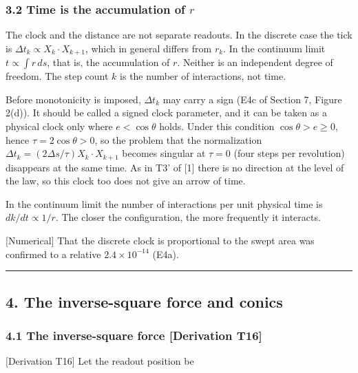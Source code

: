 \documentclass[
  a4paper,
]{article}
\begin{document}
\subsubsection{\texorpdfstring{3.2 Time is the accumulation of
\(r\)}{3.2 Time is the accumulation of r}}\label{time-is-the-accumulation-of-r}

The clock and the distance are not separate readouts. In the discrete
case the tick is \(\Delta t_k\propto X_k\cdot X_{k+1}\), which in
general differs from \(r_k\). In the continuum limit
\(t\propto\int r\,ds\), that is, the accumulation of \(r\). Neither is
an independent degree of freedom. The step count \(k\) is the number of
interactions, not time.

Before monotonicity is imposed, \(\Delta t_k\) may carry a sign (E4c of
Section 7, Figure 2(d)). It should be called a signed clock parameter,
and it can be taken as a physical clock only where \(e<\cos\theta\)
holds. Under this condition \(\cos\theta>e\ge0\), hence
\(\tau=2\cos\theta>0\), so the problem that the normalization
\(\Delta t_k=(2\Delta s/\tau)X_k\cdot X_{k+1}\) becomes singular at
\(\tau=0\) (four steps per revolution) disappears at the same time. As
in T3' of {[}1{]} there is no direction at the level of the law, so this
clock too does not give an arrow of time.

In the continuum limit the number of interactions per unit physical time
is \(dk/dt\propto1/r\). The closer the configuration, the more
frequently it interacts.

{[}Numerical{]} That the discrete clock is proportional to the swept
area was confirmed to a relative \(2.4\times10^{-14}\) (E4a).

\begin{center}\rule{0.5\linewidth}{0.5pt}\end{center}

\subsection{4. The inverse-square force and
conics}\label{the-inverse-square-force-and-conics}

\subsubsection{4.1 The inverse-square force {[}Derivation
T16{]}}\label{the-inverse-square-force-derivation-t16}

{[}Derivation T16{]} Let the readout position be
\end{document}
